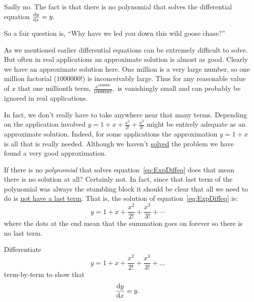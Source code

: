   Sadly no. The fact is that there is no polynomial that solves the
  differential equation $\frac{\text{d}{y}}{\text{d}{x}}=y.$

  So a fair question is, ``Why have we led you down this wild goose
  chase?''

As we mentioned earlier differential equations can be extremely
difficult to solve. But often in real applications an approximate
solution is almost as good. Clearly we have an approximate solution
here. One million is a very large number, so one million factorial
($1000000!$) is inconceivably large. Thus for any reasonable value of
$x$ that one millionth term, $\frac{x^{1000000}}{1000000!},$ is
  vanishingly small and can probably be ignored in real applications. 

In fact, we don't really have to take anywhere near that many
terms. Depending on the application involved
$y=1+x+\frac{x^2}{2!}+\frac{x^3}{3!}$ might be entirely adequate as an
approximate solution. Indeed, for some applications the approximation
$y=1+x$ is all that is really needed. Although we haven't
\underline{solved} the problem we have found a very good
approximation.


If there is no \emph{polynomial} that solves
equation~\ref{eq:ExpDiffeq} does that mean there is no solution at
all? Certainly not. In fact, since  that last term of the polynomial
was always the stumbling block it should be clear that all we need to
do is \underline{not have a last term}. That is, the solution of
equation~\ref{eq:ExpDiffeq} is:
$$
   y= 1+x+\frac{x^2}{2!}+\frac{x^3}{3!} + \cdots
$$ 
where the dots at the end mean that the summation goes on
forever so there is no last term. 
\begin{embeddedproblem}{}
Differentiate
$$
   y= 1+x+\frac{x^2}{2!}+\frac{x^3}{3!} + \ldots
$$ 
term-by-term to show that 
$$
   \frac{\text{d}{y}}{\text{d}{x}}= y.
$$ 
\end{embeddedproblem}





